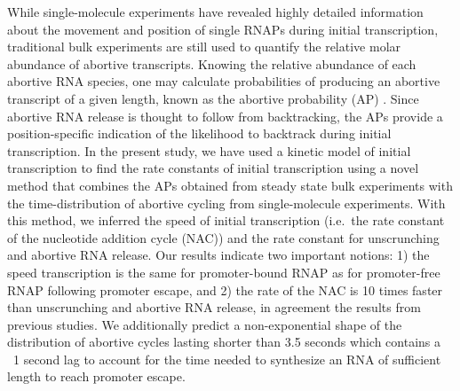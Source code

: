 While single-molecule experiments have revealed highly detailed information
about the movement and position of single RNAPs during initial transcription,
traditional bulk experiments are still used to quantify the relative molar
abundance of abortive transcripts. Knowing the relative abundance of each
abortive RNA species, one may calculate probabilities of producing an
abortive transcript of a given length, known as the abortive probability
(AP) \cite{hsu_promoter_2002, hsu_quantitative_1996}. Since abortive RNA
release is thought to follow from backtracking, the APs provide a
position-specific indication of the likelihood to backtrack during initial
transcription. In the present study, we have used a kinetic model of
initial transcription to find the rate constants of initial transcription
using a novel method that combines the APs obtained from steady state bulk
experiments with the time-distribution of abortive cycling from
single-molecule experiments. With this method, we inferred the speed of
initial transcription (i.e.\ the rate constant of the nucleotide addition
cycle (NAC)) and the rate constant for unscrunching and abortive RNA release.
Our results indicate two important notions: 1) the speed transcription is the
same for promoter-bound RNAP as for promoter-free RNAP following promoter
escape, and 2) the rate of the NAC is 10 times faster than unscrunching and
abortive RNA release, in agreement the results from previous studies. We
additionally predict a non-exponential shape of the distribution of abortive
cycles lasting shorter than 3.5 seconds which contains a ~1 second lag to
account for the time needed to synthesize an RNA of sufficient length to reach
promoter escape.
